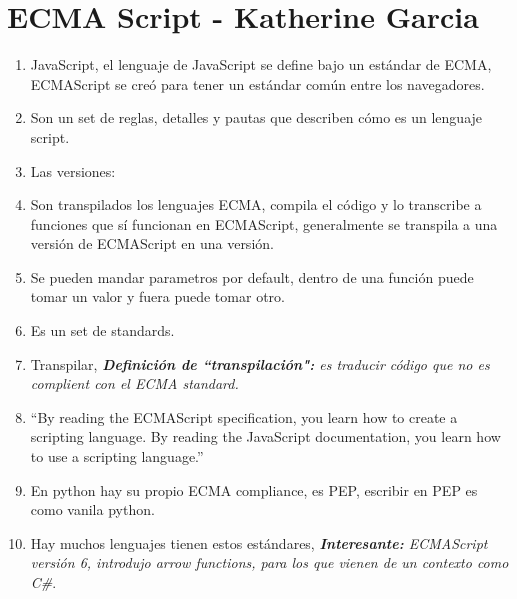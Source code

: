 \section{ECMA Script - Katherine Garcia}
\begin{enumerate}
    \item JavaScript, el lenguaje de JavaScript se define bajo un estándar de ECMA, ECMAScript se creó para tener un estándar común entre los navegadores.
    \item Son un set de reglas, detalles y pautas que describen cómo es un lenguaje script.
    \item Las versiones: 
    \item Son transpilados los lenguajes ECMA, compila el código y lo transcribe a funciones que sí funcionan en ECMAScript, generalmente se transpila a una versión de ECMAScript en una versión.
    \item Se pueden mandar parametros por default, dentro de una función puede tomar un valor y fuera puede tomar otro.
    \item Es un set de standards.
    \item Transpilar, \emph{\textbf{Definición de ``transpilación":} es traducir código que no es complient con el ECMA standard.}
    \item ``By reading the ECMAScript specification, you learn how to create a scripting language. By reading the JavaScript documentation, you learn how to use a scripting language.''
    \item En python hay su propio ECMA compliance, es PEP, escribir en PEP es como vanila python.
    \item Hay muchos lenguajes tienen estos estándares, \emph{\textbf{Interesante:} ECMAScript versión 6, introdujo arrow functions, para los que vienen de un contexto como C\#}.
\end{enumerate}

